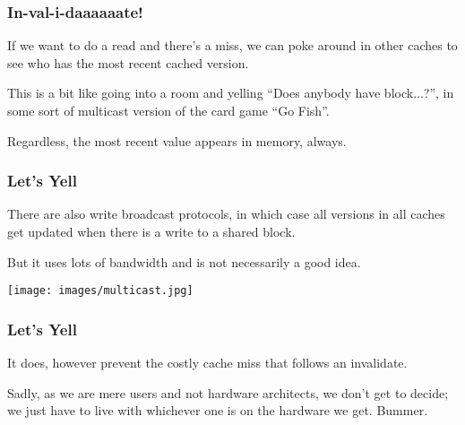 \begin{frame}
\frametitle{In-val-i-daaaaaate!}
If we want to do a read and there's a miss, we can poke around in other caches to see who has the most recent cached version. 

This is a bit like going into a room and yelling ``Does anybody have block...?'', in some sort of multicast version of the card game ``Go Fish''. 


Regardless, the most recent value appears in memory, always.


\end{frame}



\begin{frame}
\frametitle{Let's Yell}

There are also write broadcast protocols, in which case all versions in all caches get updated when there is a write to a shared block. 

But it uses lots of bandwidth and is not necessarily a good idea. 

\begin{center}
	\texttt{[image: images/multicast.jpg]}
\end{center}

\end{frame}



\begin{frame}
\frametitle{Let's Yell}

It does, however prevent the costly cache miss that follows an invalidate. 

Sadly, as we are mere users and not hardware architects, we don't get to decide; we just have to live with whichever one is on the hardware we get. Bummer.


\end{frame}

